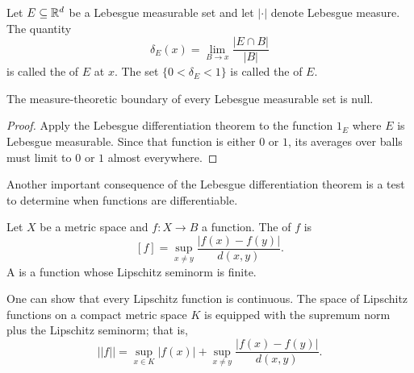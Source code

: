 \begin{definition}
Let $E \subseteq \mathbb{R}^d$ be a Lebesgue measurable set and let $|\cdot|$ denote Lebesgue measure.
The quantity
$$\delta_E(x) = \lim_{B \to x} \frac{|E \cap B|}{|B|}$$
is called the  of $E$ at $x$. The set $\{0 < \delta_E < 1\}$ is called the  of $E$.
\end{definition}

\begin{theorem}
The measure-theoretic boundary of every Lebesgue measurable set is null.
\end{theorem}
\begin{proof}
Apply the Lebesgue differentiation theorem to the function $1_E$ where $E$ is Lebesgue measurable.
Since that function is either $0$ or $1$, its averages over balls must limit to $0$ or $1$ almost everywhere.
\end{proof}

\begin{subsec}
Another important consequence of the Lebesgue differentiation theorem is a test to determine when functions are differentiable.
\end{subsec}

\begin{definition}
Let $X$ be a metric space and $f: X \to B$ a function. The  of $f$ is
$$[f] = \sup_{x \neq y} \frac{|f(x) - f(y)|}{d(x, y)}.$$
A  is a function whose Lipschitz seminorm is finite.
\end{definition}

\begin{subsec}
One can show that every Lipschitz function is continuous. The space of Lipschitz functions on a compact metric space $K$ is equipped with the supremum norm plus the Lipschitz seminorm; that is,
$$||f|| = \sup_{x \in K} |f(x)| + \sup_{x \neq y} \frac{|f(x) - f(y)|}{d(x, y)}.$$
\end{subsec}


